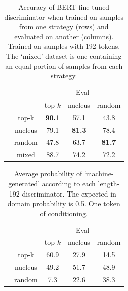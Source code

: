 \begin{table}[t]
  \small
  \centering
  \begin{tabular}{|c c|c|c|c|}
    \hline
    & & \multicolumn{3}{c|}{Eval} \\
    \cline{3-5}
    &            & top-$k$         & nucleus & random \\
    \hline
    \multirow{3}{0.7em}{\rotatebox[origin=c]{90}{\parbox[c]{1cm}{\centering Train}}} 
    & \multicolumn{1}{|c|}{top-k}   & \textbf{90.1} & 57.1          & 43.8 \\
    & \multicolumn{1}{|c|}{nucleus} & 79.1          & \textbf{81.3} & 78.4 \\
    & \multicolumn{1}{|c|}{random}  & 47.8          & 63.7          & \textbf{81.7} \\
    \hline
    & \multicolumn{1}{|c|}{mixed}  & 88.7          & 74.2          & 72.2 \\
    \hline
  \end{tabular}
  \caption{Accuracy of BERT fine-tuned discriminator when trained on samples from one strategy (rows) and evaluated on another (columns). Trained on samples with 192 tokens. The `mixed' dataset is one containing an equal portion of samples from each strategy.}
  \label{tab:transfer_accuracy}
\end{table}

\begin{table}[t]
  \small
  \centering
  \begin{tabular}{|c c|c|c|c|}
    \hline
    & & \multicolumn{3}{c|}{Eval} \\
    \cline{3-5}
    &            & top-$k$         & nucleus & random \\
    \hline
    \multirow{3}{0.7em}{\rotatebox[origin=c]{90}{\parbox[c]{1cm}{\centering Train}}} 
    & \multicolumn{1}{|c|}{top-k}   & 60.9 & 27.9 & 14.5 \\
    & \multicolumn{1}{|c|}{nucleus} & 49.2 & 51.7 & 48.9 \\
    & \multicolumn{1}{|c|}{random}  &  7.3 & 22.6 & 38.3 \\
    \hline
  \end{tabular}
  \caption{Average probability of `machine-generated' according to each length-192 discriminator. The expected in-domain probability is 0.5. One token of conditioning.}
  \label{tab:transfer-prediction}
\end{table}

